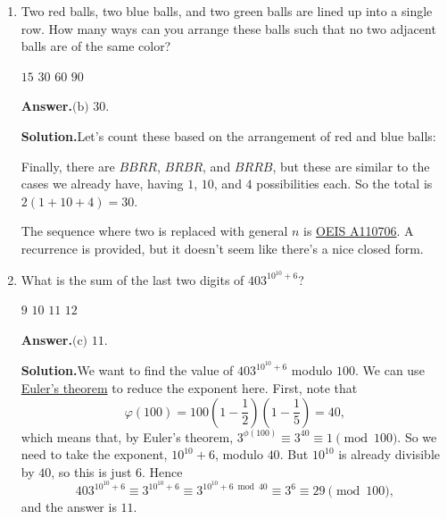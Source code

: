 \documentclass[11pt,paper=letter]{scrartcl}
\newcommand{\ans}{{\sffamily \bfseries Answer.}\;}
\newcommand{\ansb}[2]{\ans\(\boxed{\text{(#1) #2}}\).}
\newcommand{\sol}{{\sffamily \bfseries Solution.}\;}
\newenvironment{rem}%
{\noindent \ignorespaces \small \sffamily \sansmath {\bfseries Remark.}}%
{\ignorespacesafterend}
\begin{document}
\begin{enumerate}[left=0pt]

\item Two red balls, two blue balls, and two green balls are lined up into a single row. How many ways can you arrange these balls such that no two adjacent balls are of the same color?

\fourch
{$15$}
{$30$}
{$60$}
{$90$}

\ansb{b}{$30$}

\sol Let's count these based on the arrangement of red and blue balls:


Finally, there are $BBRR$, $BRBR$, and $BRRB$, but these are similar to the cases we already have, having $1$, $10$, and $4$ possibilities each. So the total is $2(1 + 10 + 4) = 30$.

\begin{rem}
The sequence where two is replaced with general $n$ is \href{https://oeis.org/A110706}{OEIS A110706}. A recurrence is provided, but it doesn't seem like there's a nice closed form.
\end{rem}

\item What is the sum of the last two digits of $403^{10^{10} + 6}$?

\fourch
{$9$}
{$10$}
{$11$}
{$12$}

\ansb{c}{$11$}

\sol We want to find the value of $403^{10^{10} + 6}$ modulo $100$. We can use \href{https://en.wikipedia.org/wiki/Euler's_theorem}{Euler's theorem} to reduce the exponent here. First, note that \[
\varphi\left(100\right) = 100\left(1 - \frac{1}{2}\right)\left(1 - \frac{1}{5}\right) = 40,
\]
which means that, by Euler's theorem, $3^{\phi(100)} \equiv 3^{40} \equiv 1 \pmod{100}$. So we need to take the exponent, $10^{10} + 6$, modulo $40$. But $10^{10}$ is already divisible by $40$, so this is just $6$. Hence \[
  403^{10^{10} + 6} \equiv 3^{10^{10} + 6} \equiv 3^{10^{10} + 6 \bmod 40} \equiv 3^6 \equiv 29 \pmod{100},
\]
and the answer is $11$.


\end{enumerate}
\end{document}
